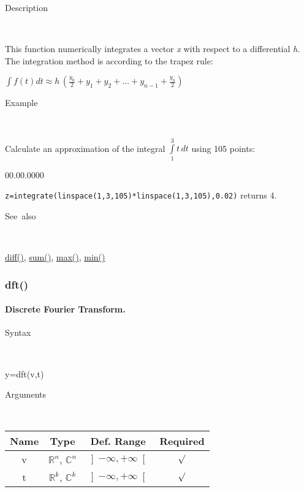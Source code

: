 \begin{description}
\item [Description]~
\end{description}
This function numerically integrates a vector \textit{x} with respect
to a differential \textit{h}. The integration method is according
to the trapez rule:

\medskip{}
$\int f\left(t\right)dt\approx h\,\left({\displaystyle \frac{y_{0}}{2}}+y_{1}+y_{2}+\ldots+y_{n-1}+{\displaystyle \frac{y_{n}}{2}}\right)$
\medskip{}

\begin{description}
\item [Example]~
\end{description}
\noindent Calculate an approximation of the integral $\int\limits _{1}^{3}t\, dt$
using 105 points:

\begin{lyxlist}{00.00.0000}
\item [\texttt{z=integrate(linspace(1,3,105){*}linspace(1,3,105),0.02)}]returns
4.
\end{lyxlist}
\begin{description}
\item [See~also]~
\end{description}
\textcolor{blue}{\hyperlink{diff}{diff()}}\textcolor{black}{,} \textcolor{blue}{\hyperlink{sum}{sum()}}\textcolor{black}{,}
\textcolor{blue}{\hyperlink{max}{max()}}\textcolor{black}{,} \textcolor{blue}{\hyperlink{min}{min()}}


\newpage
{}


\subsubsection*{\hypertarget{dft}{}{\Large dft()}}


\paragraph{\label{par:Discrete-Fourier-Transform}Discrete Fourier Transform.}

\begin{description}
\item [Syntax]~
\end{description}
y=dft(v,t)

\begin{description}
\item [Arguments]~
\end{description}
\begin{tabular}{|c|c|c|c|}
\hline 
Name&
Type&
Def. Range&
Required\tabularnewline
\hline
\hline 
v&
$\mathbb{R}^{n}$, $\mathbb{C}^{n}$&
$\left]-\infty,+\infty\right[$&
$\surd$\tabularnewline
\hline 
t&
$\mathbb{R}^{k}$, $\mathbb{C}^{k}$&
$\left]-\infty,+\infty\right[$&
$\surd$\tabularnewline
\hline
\end{tabular}

